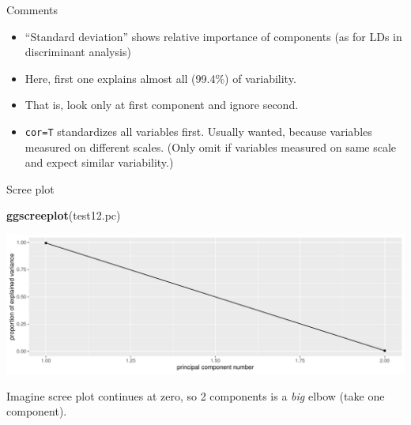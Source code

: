 \documentclass[
  ignorenonframetext,
]{beamer}
\newenvironment{Shaded}{\begin{snugshade}}{\end{snugshade}}
\newcommand{\KeywordTok}[1]{\textcolor[rgb]{0.13,0.29,0.53}{\textbf{#1}}}
\newcommand{\NormalTok}[1]{#1}
\begin{document}
\begin{frame}[fragile]{Comments}
\protect\hypertarget{comments-29}{}

\begin{itemize}
\item
  ``Standard deviation'' shows relative importance of components (as for
  LDs in discriminant analysis)
\item
  Here, first one explains almost all (99.4\%) of variability.
\item
  That is, look only at first component and ignore second.
\item
  \texttt{cor=T} standardizes all variables first. Usually wanted,
  because variables measured on different scales. (Only omit if
  variables measured on same scale and expect similar variability.)
\end{itemize}

\end{frame}

\begin{frame}[fragile]{Scree plot}
\protect\hypertarget{scree-plot-1}{}

\begin{Shaded}
\begin{Highlighting}[]
\KeywordTok{ggscreeplot}\NormalTok{(test12.pc)}
\end{Highlighting}
\end{Shaded}

\includegraphics{slides_d29_files/figure-beamer/unnamed-chunk-425-1.pdf}

Imagine scree plot continues at zero, so 2 components is a \emph{big}
elbow (take one component).

\end{frame}
\end{document}
